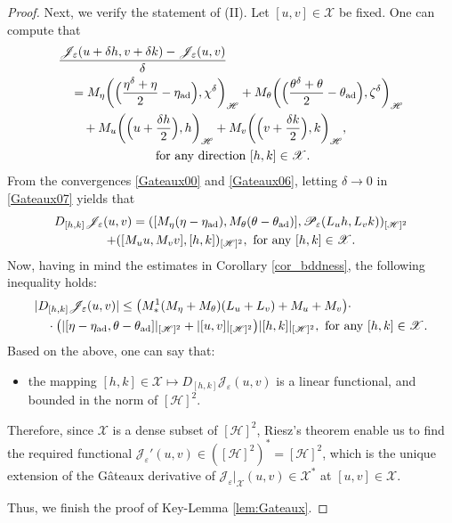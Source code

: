 \documentclass{sinst}
\numberwithin{equation}{section}
\theoremstyle{plain}
\theoremstyle{definition}
\def\sH{\mathscr{H}}
\def\sJ{\mathscr{J}}
\def\sP{\mathscr{P}}
\def\sX{\mathscr{X}}
\def\ad{{\rm ad}}
\begin{document}
\begin{proof}
  Next, we verify the statement of (II). Let $[u,v] \in \sX$ be fixed. One can compute that
  \begin{gather}
    \begin{aligned}
      &\frac{\sJ_\varepsilon(u + \delta h, v + \delta k) - \sJ_\varepsilon(u,v)}{\delta}
      \\
      &\quad = M_\eta \biggl( \Bigl( \frac{\eta^\delta + \eta}{2} - \eta_\ad \Bigr), \chi^\delta \biggr)_\sH + M_\theta \biggl( \Bigl( \frac{\theta^\delta + \theta}{2} - \theta_\ad \Bigr), \zeta^\delta \biggr)_\sH \label{Gateaux07}
      \\
      &\qquad + M_u \biggl( \Bigl( u + \frac{\delta h}{2} \Bigr), h \biggr)_\sH + M_v \biggl( \Bigl( v + \frac{\delta k}{2} \Bigr), k \biggr)_\sH,
    \end{aligned}
    \\
    \mbox{ for any direction } [h,k] \in \sX.
  \end{gather}
  From the convergences \eqref{Gateaux00} and \eqref{Gateaux06}, letting $\delta \to 0$ in \eqref{Gateaux07} yields that
  \begin{gather}
    D_{[h,k]} \sJ_\varepsilon(u,v) = ([M_\eta(\eta - \eta_{\rm ad}), M_\theta(\theta - \theta_{\rm ad})], \sP_\varepsilon(L_u h,L_v k))_{[\sH]^2} 
    \\
    + ([M_u u,M_v v], [h,k])_{[\sH]^2}, \mbox{ for any } [h,k] \in \sX.
  \end{gather}
  Now, having in mind the estimates in Corollary \ref{cor_bddness}, the following inequality holds:
  \begin{align}
    &|D_{[h,k]} \sJ_\varepsilon(u,v)| \leq \bigl( M_*^1(M_\eta + M_\theta)(L_u + L_v) + M_u + M_v \bigr) \cdot 
    \\
    &\quad \cdot \bigl( |[\eta - \eta_\ad, \theta - \theta_\ad]|_{[\sH]^2} + |[u,v]|_{[\sH]^2} \bigr) |[h,k]|_{[\sH]^2}, \mbox{ for any } [h,k] \in \sX.
  \end{align}
  Based on the above, one can say that:
  \begin{itemize}
    \item[($\sharp 2$)] the mapping $[h,k] \in \sX \mapsto D_{[h,k]} \sJ_\varepsilon(u,v)$ is a linear functional, and bounded in the norm of $[\sH]^2$.
  \end{itemize}
  Therefore, since $\sX$ is a dense subset of $[\sH]^2$, Riesz's theorem enable us to find the required functional $\sJ_\varepsilon'(u,v) \in ([\sH]^2)^* = [\sH]^2$, which is the unique extension of the G\^{a}teaux derivative of $\sJ_\varepsilon|_\sX(u,v) \in \sX^*$ at $[u,v] \in \sX$.

  Thus, we finish the proof of Key-Lemma \ref{lem:Gateaux}.

\end{proof}
\end{document}
